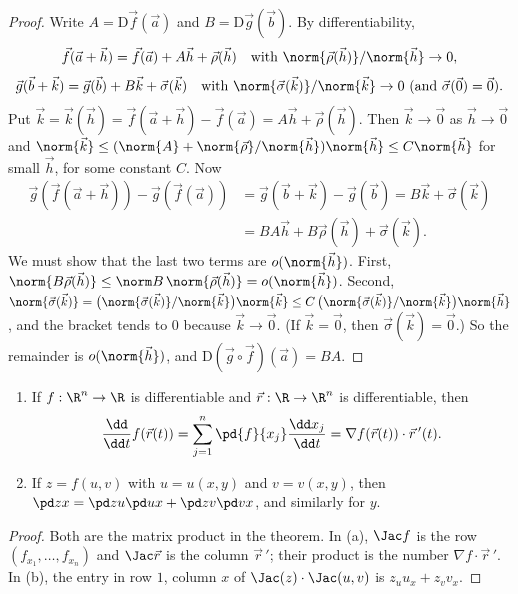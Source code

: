 \begin{proof}
Write $A=\mathrm{D}\vec f(\vec a)$ and $B=\mathrm{D}\vec g(\vec b)$. By differentiability,
\[
\vec f(\vec a+\vec h)=\vec f(\vec a)+A\vec h+\vec\rho(\vec h)\quad\text{with }\norm{\vec\rho(\vec h)}/\norm{\vec h}\to0,
\]
\[
\vec g(\vec b+\vec k)=\vec g(\vec b)+B\vec k+\vec\sigma(\vec k)\quad\text{with }\norm{\vec\sigma(\vec k)}/\norm{\vec k}\to0 \text{ (and }\vec\sigma(\vec 0)=\vec 0).
\]
Put $\vec k=\vec k(\vec h)=\vec f(\vec a+\vec h)-\vec f(\vec a)=A\vec h+\vec\rho(\vec h)$. Then $\vec k\to\vec0$ as $\vec h\to\vec 0$ and $\norm{\vec k}\le(\norm{A}+\norm{\vec\rho}/\norm{\vec h})\norm{\vec h}\le C\norm{\vec h}$ for small $\vec h$, for some constant $C$. Now
\begin{align*}
\vec g(\vec f(\vec a+\vec h))-\vec g(\vec f(\vec a))&=\vec g(\vec b+\vec k)-\vec g(\vec b)=B\vec k+\vec\sigma(\vec k)\\
&=BA\vec h+B\vec\rho(\vec h)+\vec\sigma(\vec k).
\end{align*}
We must show that the last two terms are $o(\norm{\vec h})$. First, $\norm{B\vec\rho(\vec h)}\le\norm B\,\norm{\vec\rho(\vec h)}=o(\norm{\vec h})$. Second, $\norm{\vec\sigma(\vec k)}=\bigl(\norm{\vec\sigma(\vec k)}/\norm{\vec k}\bigr)\norm{\vec k}\le C\,\bigl(\norm{\vec\sigma(\vec k)}/\norm{\vec k}\bigr)\norm{\vec h}$, and the bracket tends to $0$ because $\vec k\to\vec0$. (If $\vec k=\vec0$, then $\vec\sigma(\vec k)=\vec 0$.) So the remainder is $o(\norm{\vec h})$, and $\mathrm{D}(\vec g\circ\vec f)(\vec a)=BA$.
\end{proof}

\begin{corollary}\label{cor:chaincases}
\begin{enumerate}[label=(\alph*)]
  \item If $f:\R^n\to\R$ is differentiable and $\vec r:\R\to\R^n$ is differentiable, then
  \[
  \frac{\dd}{\dd t}f(\vec r(t))=\sum_{j=1}^n\pd{f}{x_j}\frac{\dd x_j}{\dd t}=\nabla f(\vec r(t))\cdot\vec r\,'(t).
  \]
  \item If $z=f(u,v)$ with $u=u(x,y)$ and $v=v(x,y)$, then $\displaystyle\pd zx=\pd zu\pd ux+\pd zv\pd vx$, and similarly for $y$.
\end{enumerate}
\end{corollary}

\begin{proof}
Both are the matrix product in the theorem. In (a), $\Jac f$ is the row $(f_{x_1},\dots,f_{x_n})$ and $\Jac\vec r$ is the column $\vec r\,'$; their product is the number $\nabla f\cdot\vec r\,'$. In (b), the entry in row $1$, column $x$ of $\Jac(z)\cdot\Jac(u,v)$ is $z_uu_x+z_vv_x$.
\end{proof}

